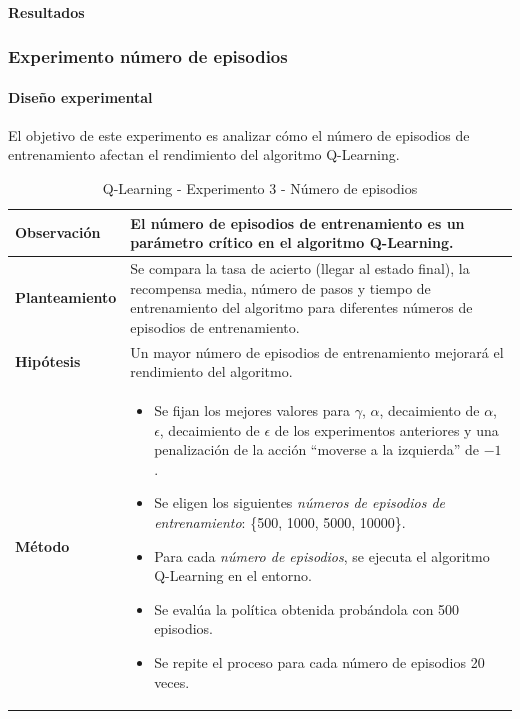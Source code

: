 \paragraph{Resultados}

\subsubsection{Experimento número de episodios}

\paragraph{Diseño experimental}
El objetivo de este experimento es analizar cómo el número de episodios de entrenamiento afectan el rendimiento del algoritmo Q-Learning.
\begin{table}[H]
    \centering
    \begin{tabularx}{\textwidth}{|p{4cm}|X|} %
        \hline %
        \textbf{Observación} & El número de episodios de entrenamiento es un parámetro crítico en el algoritmo Q-Learning.
        \\ \hline
        \textbf{Planteamiento} & Se compara la tasa de acierto (llegar al estado final), la recompensa media, número de pasos y tiempo de entrenamiento del algoritmo para diferentes números de episodios de entrenamiento.
        \\ \hline
        \textbf{Hipótesis} & Un mayor número de episodios de entrenamiento mejorará el rendimiento del algoritmo.
        \\ \hline
        \textbf{Método} &
        \begin{itemize}
            \item Se fijan los mejores valores para \(\gamma\), \(\alpha\), decaimiento de \(\alpha\), \(\epsilon\), decaimiento de \(\epsilon\) de los experimentos anteriores y una penalización de la acción ``moverse a la izquierda'' de $-1$.
            \item Se eligen los siguientes \textit{números de episodios de entrenamiento}: \{500, 1000, 5000, 10000\}.
            \item Para cada \textit{número de episodios}, se ejecuta el algoritmo Q-Learning en el entorno.
            \item Se evalúa la política obtenida probándola con 500 episodios.
            \item Se repite el proceso para cada número de episodios 20 veces.
        \end{itemize}
        \\ \hline
    \end{tabularx}
    \caption{Q-Learning - Experimento 3 - Número de episodios}
    \label{tab:diseñoQLEarningExp3}
\end{table}


